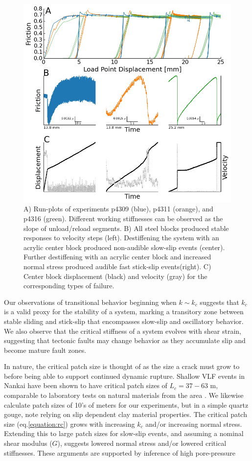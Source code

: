 \documentclass[11pt]{article}
\begin{document}
\begin{figure}
	\centering
		\includegraphics[scale=0.7]{../Figures/Fig_Runplot/runplot.png}
   	\caption{A) Run-plots of experiments p4309 (blue), p4311 (orange), and p4316
   	(green). Different working stiffnesses can be observed as the slope of
   	unload/reload segments. B) All steel blocks produced stable responses to
   	velocity steps (left). Destiffening the system with an acrylic center block
   	produced non-audible slow-slip events (center). Further destiffening with an
   	acrylic center block and increased normal stress produced audible fast
   	stick-slip events(right). C) Center block displacement (black) and velocity
   	(gray) for the corresponding types of failure.}
  	\label{Figure:Runplot}
\end{figure}

Our observations of transitional behavior beginning when $k \sim k_c$ suggests
that $k_c$ is a valid proxy for the stability of a system, marking a transitory
zone between stable sliding and stick-slip that encompasses slow-slip and
oscillatory behavior. We also observe that the critical stiffness of a system
evolves with shear strain, suggesting that tectonic faults may change behavior
as they accumulate slip and become mature fault zones.

In nature, the critical patch size is thought of as the size a crack must grow
to before being able to support continued dynamic rupture. Shallow VLF events in
Nankai have been shown to have critical patch sizes of $L_c = 37-63$ m,
comparable to laboratory tests on natural materials from the area
\cite{Ikari:2013}. We likewise calculate  patch sizes of 10's of meters for our
experiments, but in a simple quartz gouge,  note relying on slip dependent clay
material properties. The critical patch size (eq.\ref{equation:rc}) grows with
increasing $k_c$ and/or increasing normal stress. Extending this to large patch
sizes for slow-slip events, and assuming a nominal shear modulus ($G$), suggests
lowered normal stress and/or lowered critical stiffnesses. These arguments are
supported by inference of high pore-pressure
\end{document}
